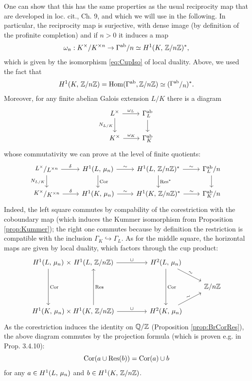 \documentclass[a4paper, oneside]{memoir}
\begin{document}
\begin{remark}
	One can show that this has the same properties as the usual reciprocity map that are developed in loc. cit., Ch. 9, and which we will use in the following. In particular, the reciprocity map is surjective, with dense image (by definition of the profinite completion) and if $n>0$ it induces a map
	\begin{equation}\label{eq:RecIso}
		\omega_n:K^\times / K^{\times n} \to \Gamma^{\text{ab}}/n \simeq H^{1}( K, \, \mathbb{Z}/n\mathbb{Z} )^*,
	\end{equation}
	which is given by the isomorphism \eqref{eq:CupIso} of local duality. Above, we used the fact that \[\H{1}{\K}{\Zn}=
		\Hom(\Gamma^{\text{ab}},\Zn)\simeq(\sfrac{\Gamma^{\text{ab}}}{n})^*.\]
	Moreover, for any finite abelian Galois extension $L / K$ there is a diagram
	\begin{equation}\label{eq:NormDiag}
		\begin{tikzcd}
			L^\times \ar[r, "\omega_L"] \ar[d, swap, "N_{L/\K}"] & \Gamma_L^{\text{ab}} \ar[d] \\
			K^\times \ar[r, "\omega_K"]       & \Gamma_K^{\text{ab}}
		\end{tikzcd}
	\end{equation}
	whose commutativity we can prove at the level of finite quotients:
	\[
		\begin{tikzcd}
			\sfrac{L^\times}{L^{\times n}}\ar[r,"\delta"]\ar[d, swap, "N_{L/\K}"] & \H{1}{L}{\mu_n} \ar[r, "\sim"] \ar[d, "\Cor"] & \H{1}{L}{\Zn}^* \ar[r, "\sim"] \ar[d, "\Res^*"] & \Gamma_L^{\text{ab}}/n \ar[d] \\
			\sfrac{K^\times}{K^{\times n}}\ar[r,"\delta"] & \H{1}{K}{\mu_n} \ar[r, "\sim"] & \H{1}{\K}{\Zn}^* \ar[r, "\sim"] & \Gamma_K^{\text{ab}}/n
		\end{tikzcd}
	\]
	Indeed, the left square commutes by compability of the corestriction with the coboundary map (which induces the Kummer isomorphism from Proposition \ref{prop:Kummer}); the right one commutes because by definition the restriction is compatible with the inclusion $\Gamma_K\hookrightarrow\Gamma_L$. As for the middle square, the horizontal maps are given by local duality, which factors through the cup product:
	\[
		\tikzset{
			symbol/.style={
					draw=none,
					every to/.append style={
							edge node={node [sloped, allow upside down, auto=false]{$#1$}}}
				}
		}
		\begin{tikzcd}
			\H{1}{L}{\mu_n}\ar[dd, "\Cor"]\arrow[r,symbol=\times] &[-2em] \H{1}{L}{\Zn} \ar[r, "\cup"]&[2em] \H{2}{L}{\mu_n} \ar[dd, "\Cor"]\ar[rd, sloped, "\sim"]&\\
			&&& \Zn \\
			\H{1}{\K}{\mu_n} \arrow[r,symbol=\times] & \H{1}{\K}{\Zn}  \ar[swap, uu, "\Res"] \ar[r, "\cup"]& \H{2}{\K}{\mu_n} \ar[ru, sloped, "\sim"]&
		\end{tikzcd}
	\]
	As the corestriction induces the identity on $\mathbb{Q}/\mathbb{Z}$ (Proposition \ref{prop:BrCorRes}), the above diagram commutes by the projection formula (which is proven e.g. in \cite{GilleSzamuely} Prop. 3.4.10):
	\[
		\operatorname{Cor}(a\cup\operatorname{Res}(b))=\operatorname{Cor}(a)\cup b
	\]
	for any $a\in H^{1}( L, \, \mu_n )$ and $b\in H^{1}( K, \, \mathbb{Z}/n\mathbb{Z} )$.


\end{remark}
\end{document}
